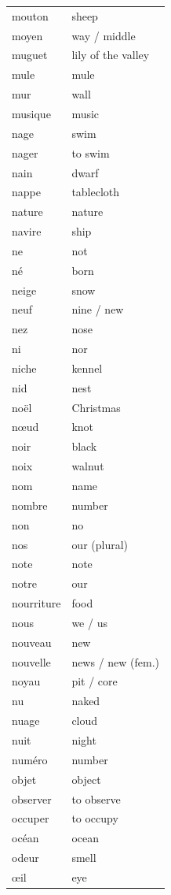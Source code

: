 \documentclass[12pt,a4paper]{article}
\begin{document}
\begin{longtable}{p{4cm} p{6cm}}
mouton & sheep \\
moyen & way / middle \\
muguet & lily of the valley \\
mule & mule \\
mur & wall \\
musique & music \\
nage & swim \\
nager & to swim \\
nain & dwarf \\
nappe & tablecloth \\
nature & nature \\
navire & ship \\
ne & not \\
né & born \\
neige & snow \\
neuf & nine / new \\
nez & nose \\
ni & nor \\
niche & kennel \\
nid & nest \\
noël & Christmas \\
nœud & knot \\
noir & black \\
noix & walnut \\
nom & name \\
nombre & number \\
non & no \\
nos & our (plural) \\
note & note \\
notre & our \\
nourriture & food \\
nous & we / us \\
nouveau & new \\
nouvelle & news / new (fem.) \\
noyau & pit / core \\
nu & naked \\
nuage & cloud \\
nuit & night \\
numéro & number \\
objet & object \\
observer & to observe \\
occuper & to occupy \\
océan & ocean \\
odeur & smell \\
œil & eye \\

\end{longtable}
\end{document}
